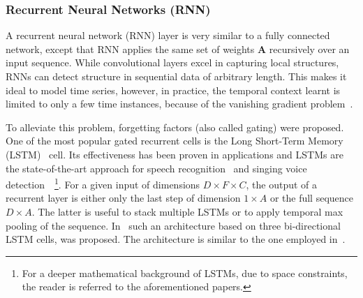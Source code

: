 \subsubsection{Recurrent Neural Networks (RNN)}%


A recurrent neural network (RNN) layer is very similar to a fully connected network, except that RNN applies the same set of weights \(\mathbf{A}\) recursively over an input sequence.
While convolutional layers excel in capturing local structures, RNNs can detect structure in sequential data of arbitrary length. %
This makes it ideal to model time series, however, in practice, the temporal context learnt is limited to only a few time instances, because of the vanishing gradient problem~\cite{Hochreiter98}.

To alleviate this problem, forgetting factors (also called gating) were proposed.
One of the most popular gated recurrent cells is the Long Short-Term Memory (LSTM)~\cite{Hochreiter97} cell.
Its effectiveness has been proven in applications and LSTMs are the state-of-the-art approach for speech recognition~\cite{Graves13} and singing voice detection~\cite{Leglaive15}~\footnote{For a deeper mathematical background of LSTMs, due to space constraints, the reader is referred to the aforementioned papers.}.
For a given input of dimensions \(D \times F \times C\), the output of a recurrent layer is either only the last step of dimension \(1 \times A\) or the full sequence \(D \times A\).
The latter is useful to stack multiple LSTMs or to apply temporal max pooling of the sequence.
In~\cite{stoeter17} such an architecture based on three bi-directional LSTM cells, was proposed. The architecture is similar to the one employed in~\cite{Leglaive15}.

